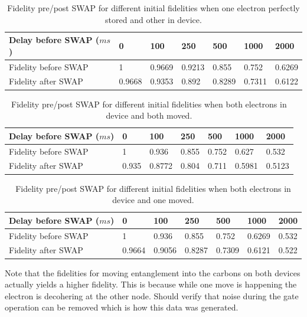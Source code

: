 \documentclass{article}
\begin{document}
\begin{table}[!htb]
\centering
\begin{tabular}{|l|l|l|l|l|l|l|}
\hline
  Delay before SWAP ($ms$)  & 0 & 100 & 250 & 500 & 1000 & 2000 \\
\hline
Fidelity before SWAP  & 1 & 0.9669 & 0.9213 & 0.855 & 0.752 & 0.6269 \\
\hline
Fidelity after SWAP   & 0.9668 & 0.9353 & 0.892 & 0.8289 & 0.7311 & 0.6122 \\
\hline
\end{tabular}
\caption{Fidelity pre/post SWAP for different initial fidelities when one electron perfectly stored and other in device.}
\end{table}

\begin{table}[!htb]
\centering
\begin{tabular}{|l|l|l|l|l|l|l|}
\hline
  Delay before SWAP ($ms$)  & 0 & 100 & 250 & 500 & 1000 & 2000 \\
\hline
Fidelity before SWAP  & 1 & 0.936 & 0.855 & 0.752 & 0.627 & 0.532 \\
\hline
Fidelity after SWAP   & 0.935 & 0.8772 & 0.804 & 0.711 & 0.5981 & 0.5123 \\
\hline
\end{tabular}
\caption{Fidelity pre/post SWAP for different initial fidelities when both electrons in device and both moved.}
\end{table}

\begin{table}[!htb]
\centering
\begin{tabular}{|l|l|l|l|l|l|l|}
\hline
  Delay before SWAP ($ms$)  & 0 & 100 & 250 & 500 & 1000 & 2000 \\
\hline
Fidelity before SWAP  & 1 & 0.936 & 0.855 & 0.752 & 0.6269 & 0.532 \\
\hline
Fidelity after SWAP   & 0.9664 & 0.9056 & 0.8287 & 0.7309 & 0.6121 & 0.522 \\
\hline
\end{tabular}
\caption{Fidelity pre/post SWAP for different initial fidelities when both electrons in device and one moved.}
\end{table}

Note that the fidelities for moving entanglement into the carbons on both devices actually yields a higher fidelity.  This is because while one move is happening the electron is decohering at the other node.  Should verify that noise during the gate operation can be removed which is how this data was generated.
\end{document}

